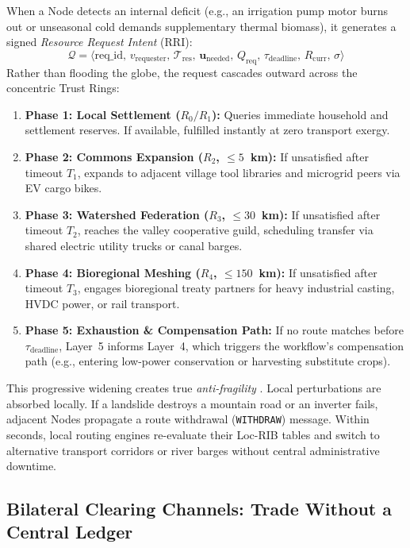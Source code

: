 When a Node detects an internal deficit (e.g., an irrigation pump motor burns out or unseasonal cold demands supplementary thermal biomass), it generates a signed \textit{Resource Request Intent} (RRI):
\begin{equation}
\mathcal{Q} = \langle \mathrm{req\_id}, \, v_{\mathrm{requester}}, \, \mathcal{T}_{\mathrm{res}}, \, \mathbf{u}_{\mathrm{needed}}, \, Q_{\mathrm{req}}, \, \tau_{\mathrm{deadline}}, \, R_{\mathrm{curr}}, \, \sigma \rangle
\label{eq:resource_request_intent}
\end{equation}
Rather than flooding the globe, the request cascades outward across the concentric Trust Rings:
\begin{enumerate}
  \item \textbf{Phase 1: Local Settlement ($R_0 / R_1$):} Queries immediate household and settlement reserves. If available, fulfilled instantly at zero transport exergy.
  \item \textbf{Phase 2: Commons Expansion ($R_2$, $\le 5$~km):} If unsatisfied after timeout $T_1$, expands to adjacent village tool libraries and microgrid peers via EV cargo bikes.
  \item \textbf{Phase 3: Watershed Federation ($R_3$, $\le 30$~km):} If unsatisfied after timeout $T_2$, reaches the valley cooperative guild, scheduling transfer via shared electric utility trucks or canal barges.
  \item \textbf{Phase 4: Bioregional Meshing ($R_4$, $\le 150$~km):} If unsatisfied after timeout $T_3$, engages bioregional treaty partners for heavy industrial casting, HVDC power, or rail transport.
  \item \textbf{Phase 5: Exhaustion \& Compensation Path:} If no route matches before $\tau_{\mathrm{deadline}}$, Layer~5 informs Layer~4, which triggers the workflow's compensation path (e.g., entering low-power conservation or harvesting substitute crops).
\end{enumerate}

This progressive widening creates true \textit{anti-fragility} \parencite{meadows2008}. Local perturbations are absorbed locally. If a landslide destroys a mountain road or an inverter fails, adjacent Nodes propagate a route withdrawal (\texttt{WITHDRAW}) message. Within seconds, local routing engines re-evaluate their Loc-RIB tables and switch to alternative transport corridors or river barges without central administrative downtime.

\subsection{Bilateral Clearing Channels: Trade Without a Central Ledger}

